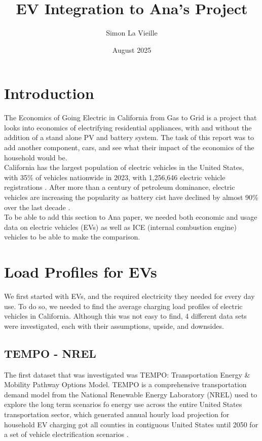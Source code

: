 \documentclass{article}
\title{EV Integration to Ana's Project}
\author{Simon La Vieille}
\date{August 2025}
\begin{document}
\maketitle

\newpage

\section{Introduction}

The Economics of Going Electric in California from Gas to Grid is a project that looks into economics of electrifying residential appliances, with and without the addition of a stand alone PV and battery system. The task of this report was to add another component, cars, and see what their impact of the economics of the household would be. \\

California has the largest population of electric vehicles in the United States, with 35\% of vehicles nationwide in 2023, with 1,256,646 electric vehicle registrations \cite{AlternateFuelsDataCenter}. After more than a century of petroleum dominance, electric vehicles are increasing the popularity as battery cist have declined by almost 90\% over the last decade \cite{TEMPO_NREL}.\\

To be able to add this section to Ana paper, we needed both economic and usage data on electric vehicles (EVs) as well as ICE (internal combustion engine) vehicles to be able to make the comparison.

\section{Load Profiles for EVs}

We first started with EVs, and the required electricity they needed for every day use. To do so, we needed to find the average charging load profiles of electric vehicles in California. Although this was not easy to find, 4 different data sets were investigated, each with their assumptions, upside, and downsides. 

\subsection{TEMPO - NREL}

The first dataset that was investigated was TEMPO: Transportation Energy \& Mobility Pathway Options Model. TEMPO is a comprehensive transportation demand model from the National Renewable Energy Laboratory (NREL) used to explore the long term scenarios fo energy use across the entire United States transportation sector, which generated annual hourly load projection for household EV charging got all counties in contiguous United States until 2050 for a set of vehicle electrification scenarios \cite{TEMPO_Report}. \\
\end{document}
